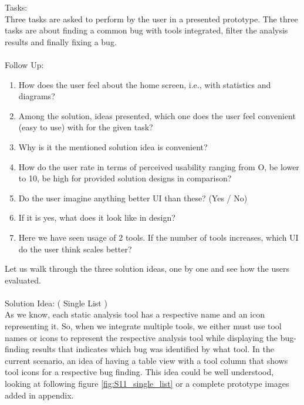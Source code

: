 Tasks: \\

Three tasks are asked to perform by the user in a presented prototype. The three tasks are about finding a common bug with tools integrated, filter the analysis results and finally fixing a bug. \\ \\

Follow Up: \\

\begin{enumerate}
\item How does the user feel about the home screen, i.e., with statistics and diagrams? 
\item Among the solution, ideas presented, which one does the user feel convenient (easy to use) with for the given task?
\item Why is it the mentioned solution idea is convenient?
\item How do the user rate in terms of perceived usability ranging from O, be lower to 10, be high for provided solution designs in comparison?
\item Do the user imagine anything better UI than these? (Yes / No)
\item If it is yes, what does it look like in design?
\item Here we have seen usage of 2 tools. If the number of tools increases, which UI do the user think scales better?
\end{enumerate}


Let us walk through the three solution ideas, one by one and see how the users evaluated. \\ \\

Solution Idea: ( Single List ) \\

As we know, each static analysis tool has a respective name and an icon representing it. So, when we integrate multiple tools, we either must use tool names or icons to represent the respective analysis tool while displaying the bug-finding results that indicates which bug was identified by what tool. In the current scenario, an idea of having a table view with a tool column that shows tool icons for a respective bug finding. This idea could be well understood, looking at following figure \ref{fig:S11_single_list} or a complete prototype images added in appendix. \\ \\

